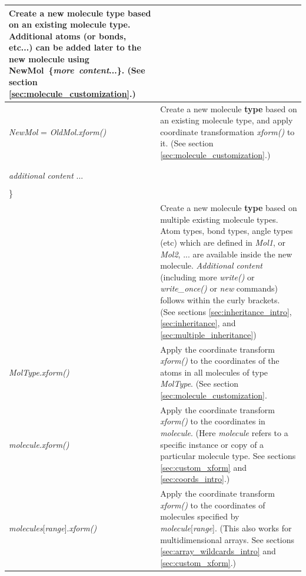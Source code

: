 \documentclass[11pt]{article}
\begin{document}
\begin{longtable}[h]{l|p{9cm}}
Create a new molecule \textbf{type} based on an existing molecule type.
Additional atoms (or bonds, etc...) can be added later to the new molecule 
using \mbox{NewMol \{\textit{more\ content}...\}}.  
(See section \ref{sec:molecule_customization}.)
\\
\hline
\textit{NewMol} = \textit{OldMol}.\textit{xform()}
&
Create a new molecule \textbf{type} based on an existing molecule type,
and apply coordinate transformation \textit{xform()} to it.
(See section \ref{sec:molecule_customization}.)
\\
\hline
\begin{tabular}[t]{l}
\textit{NewMol} \textbf{inherits} \textit{Mol1} \textit{Mol2} ... \{ \\
\\
\hspace{0.35cm} \textit{additional content} ... \\
\\
\} \\
\end{tabular}
&
Create a new molecule \textbf{type} based on multiple existing molecule types.
Atom types, bond types, angle types (etc) which are defined in
\textit{Mol1}, or \textit{Mol2}, ... are available inside the
new molecule.
\textit{Additional content} 
(including more \textit{write()} or \textit{write\_once()}
or \textit{new} commands)
follows within the curly brackets.
(See sections \ref{sec:inheritance_intro},
\ref{sec:inheritance}, and \ref{sec:multiple_inheritance})
\\
\hline
\textit{MolType}.\textit{xform()}
&
Apply the coordinate transform \textit{xform()} to the coordinates 
of the atoms in all molecules of type \textit{MolType}.
(See section \ref{sec:molecule_customization}.
\\
\hline
\textit{molecule}.\textit{xform()}
&
Apply the coordinate transform \textit{xform()} 
to the coordinates in \textit{molecule}.
(Here \textit{molecule} refers to a specific instance or copy of
 a particular molecule type.
See sections \ref{sec:custom_xform} and \ref{sec:coords_intro}.)
\\
\hline
\textit{molecules}[\textit{range}].\textit{xform()}
&
Apply the coordinate transform \textit{xform()} 
to the coordinates of molecules specified by
\mbox{\textit{molecule}[\textit{range}]}.
(This also works for multidimensional arrays.
See sections \ref{sec:array_wildcards_intro} and \ref{sec:custom_xform}.)
\\

\end{longtable}
\end{document}
